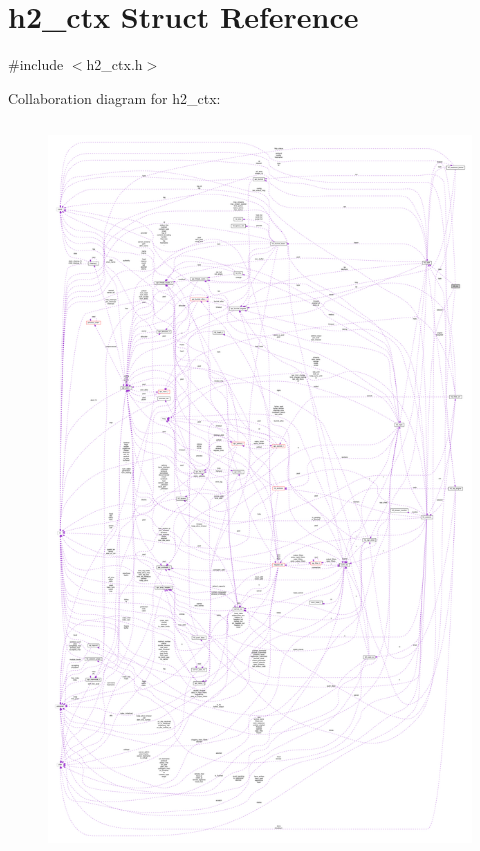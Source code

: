 \hypertarget{structh2__ctx}{}\section{h2\+\_\+ctx Struct Reference}
\label{structh2__ctx}


{\ttfamily \#include $<$h2\+\_\+ctx.\+h$>$}



Collaboration diagram for h2\+\_\+ctx\+:
\nopagebreak
\begin{figure}[H]
\begin{center}
\leavevmode
\includegraphics[height=550pt]{structh2__ctx__coll__graph}
\end{center}
\end{figure}

